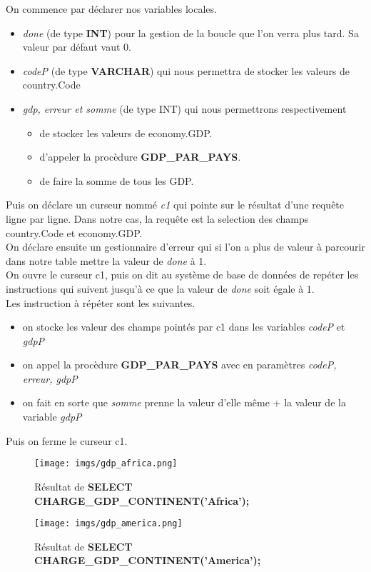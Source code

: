 \documentclass[11pt,a4paper]{article}
\begin{document}
On commence par déclarer nos variables locales.
\begin{itemize}
	\item \emph{done} (de type \textbf{INT}) pour la gestion de la boucle que l'on verra plus tard. Sa valeur par défaut vaut 0.
	\item \emph{codeP} (de type \textbf{VARCHAR}) qui nous permettra de stocker les valeurs de country.Code
	\item \emph{gdp, erreur et somme} (de type INT) qui nous permettrons respectivement
	\begin{itemize}
		\item de stocker les valeurs de economy.GDP.
		\item d'appeler la procèdure \textbf{GDP\_PAR\_PAYS}.
		\item de faire la somme de tous les GDP.
	\end{itemize}
\end{itemize}
Puis on déclare un curseur nommé \textit{c1} qui pointe sur le résultat d'une requête ligne par ligne. Dans notre cas, la requête est la selection des champs country.Code et economy.GDP.\\
On déclare ensuite un gestionnaire d'erreur qui si l'on a plus de valeur à parcourir dans notre table mettre la valeur de \emph{done} à 1.\\
On ouvre le curseur c1, puis on dit au système de base de données de repéter les instructions qui suivent jusqu'à ce que la valeur de \emph{done} soit égale à 1.\\
Les instruction à répéter sont les suivantes.
\begin{itemize}
	\item on stocke les valeur des champs pointés par c1 dans les variables \emph{codeP} et \emph{gdpP}
	\item on appel la procèdure \textbf{GDP\_PAR\_PAYS} avec en paramètres \emph{codeP, erreur, gdpP}
	\item on fait en sorte que \emph{somme} prenne la valeur d'elle même + la valeur de la variable \emph{gdpP}
\end{itemize}
Puis on ferme le curseur c1.

\begin{figure}[h]
	\centering
	\texttt{[image: imgs/gdp\_africa.png]}
	\caption{Résultat de \textbf{SELECT CHARGE\_GDP\_CONTINENT('Africa');}}
	\label{fig3}
\end{figure}

\begin{figure}[h]
	\centering
	\texttt{[image: imgs/gdp\_america.png]}
	\caption{Résultat de \textbf{SELECT CHARGE\_GDP\_CONTINENT('America');}}
	\label{fig4}
\end{figure}
\end{document}
